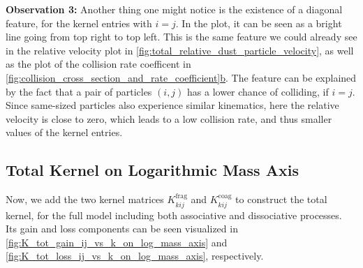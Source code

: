         \textbf{Observation 3:} Another thing one might notice is the existence of a 
        diagonal feature, for the kernel entries with $i=j$. In the plot, it can be seen as a
        bright line going from top right to top left. This is the same feature we could already see 
        in the relative velocity plot in \cref{fig:total_relative_dust_particle_velocity}, 
        as well as the plot of the collision rate coefficent in 
        \hyperref[fig:collision_cross_section_and_rate_coefficient]
        {\cref*{fig:collision_cross_section_and_rate_coefficient}b}.
        The feature can be explained by the fact that a pair of particles $(i,j)$ has a lower 
        chance of colliding, if $i = j$. Since same-sized particles also experience similar 
        kinematics, here the relative velocity is close to zero, which leads to a low 
        collision rate, and thus smaller values of the kernel entries. 



    \clearpage
    \subsection{Total Kernel on Logarithmic Mass Axis}
        
        Now, we add the two kernel matrices $K_{kij}^\text{frag}$ and $K_{kij}^\text{coag}$
        to construct the total kernel, for the full model including both associative and 
        dissociative processes. \\

        Its gain and loss components can be seen visualized in 
        \cref{fig:K_tot_gain_ij_vs_k_on_log_mass_axis} and 
        \cref{fig:K_tot_loss_ij_vs_k_on_log_mass_axis}, respectively. \\


